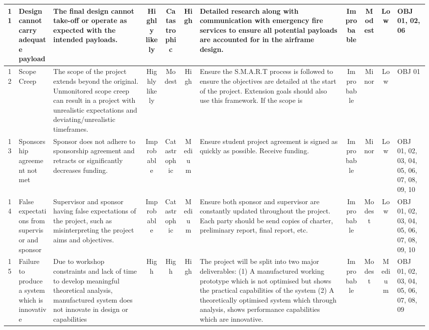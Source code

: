 \begin{appendices}
\begin{landscape}
\begin{table}[H]
{\begin{tabular}{|c|p{4cm}|p{11cm}|c|c|c|p{11cm}|c|c|c|p{4cm}}
    \hline
    11    & Design cannot carry adequate payload & The final design cannot take-off or operate as expected with the intended payloads.  & Highly likely & Catastrophic & High  & Detailed research along with communication with emergency fire services to ensure all potential payloads are accounted for in the airframe design. & Improbable & Modest & Low & OBJ 01, 02, 06\\
    \hline
    12    & Scope Creep & The scope of the project extends beyond the original. Unmonitored scope creep can result in a project with unrealistic expectations and deviating/unrealistic timeframes. & Highly likely & Modest & High  & Ensure the S.M.A.R.T process is followed to ensure the objectives are detailed at the start of the project. Extension goals should also use this framework. If the scope is  & Improbable & Minor & Low & OBJ 01\\
    \hline
    13    & Sponsorship agreement not met & Sponsor does not adhere to sponsorship agreement and retracts or significantly decreases funding. & Improbable  & Catastrophic & Medium & Ensure student project agreement is signed as quickly as possible. Receive funding. & Improbable & Minor & Low & OBJ 01, 02, 03, 04, 05, 06, 07, 08, 09, 10\\
    \hline
    14    & False expectations from supervisor and sponsor & Supervisor and sponsor having false expectations of the project, such as misinterpreting the project aims and objectives.  & Improbable  & Catastrophic & Medium & Ensure both sponsor and supervisor are constantly updated throughout the project. Each party should be send copies of charter, preliminary report, final report, etc. & Improbable & Modest & Low & OBJ 01, 02, 03, 04, 05, 06, 07, 08, 09, 10 \\
    \hline
    15 &Failure to produce a system which is innovative & Due to workshop constraints and lack of time to develop meaningful theoretical analysis, manufactured system does not innovate in design or capabilities  & High & High & High & The project will be split into two major deliverables: (1) A manufactured working prototype which is not optimised but shows the practical capabilities of the system (2) A theoretically optimised system which through analysis, shows performance capabilities which are innovative. & Improbable & Modest &Medium & OBJ 01, 02, 03, 04, 05, 06, 07, 08, 09\\
    \hline
    \end{tabular}%
    }
\end{table}%
\end{landscape}

\end{appendices}

